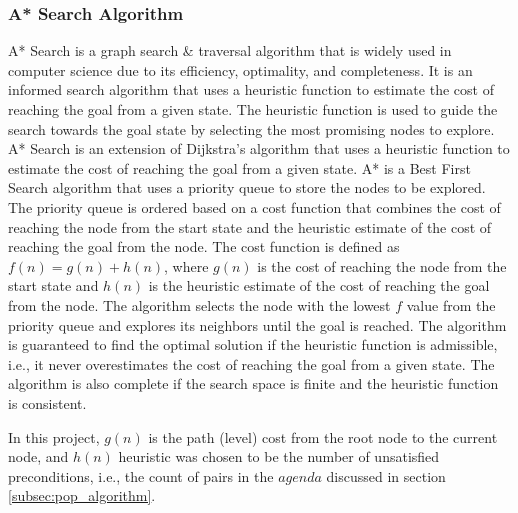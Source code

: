 \subsubsection{\acf{A*} Search Algorithm} \label{subsubsec:a_star}
\ac{A*} Search is a graph search \& traversal algorithm that is widely used in computer science due to its efficiency, optimality, and completeness. It is an informed search algorithm that uses a heuristic function to estimate the cost of reaching the goal from a given state. The heuristic function is used to guide the search towards the goal state by selecting the most promising nodes to explore. \ac{A*} Search is an extension of Dijkstra's algorithm that uses a heuristic function to estimate the cost of reaching the goal from a given state. \ac{A*} is a Best First Search algorithm that uses a priority queue to store the nodes to be explored. The priority queue is ordered based on a cost function that combines the cost of reaching the node from the start state and the heuristic estimate of the cost of reaching the goal from the node. The cost function is defined as $f(n) = g(n) + h(n)$, where $g(n)$ is the cost of reaching the node from the start state and $h(n)$ is the heuristic estimate of the cost of reaching the goal from the node. The algorithm selects the node with the lowest $f$ value from the priority queue and explores its neighbors until the goal is reached. The algorithm is guaranteed to find the optimal solution if the heuristic function is admissible, i.e., it never overestimates the cost of reaching the goal from a given state. The algorithm is also complete if the search space is finite and the heuristic function is consistent.

In this project, $g(n)$ is the path (level) cost from the root node to the current node, and $h(n)$ heuristic was chosen to be the number of unsatisfied preconditions, i.e., the count of pairs in the $agenda$ discussed in section {\ref{subsec:pop_algorithm}}.

